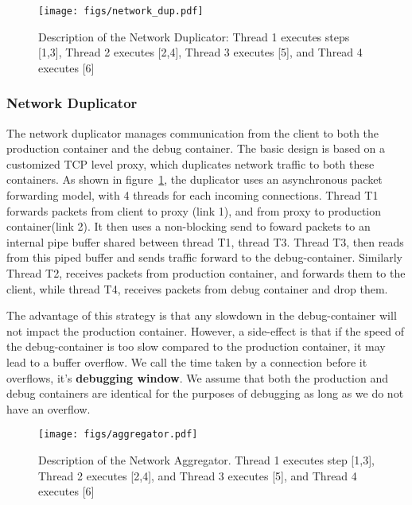 	
	\begin{figure}[ht]
		\begin{centering}
			\texttt{[image: figs/network\_dup.pdf]}
			\caption{Description of the Network Duplicator: Thread 1 executes steps [1,3], Thread 2 executes [2,4], Thread 3 executes [5], and Thread 4 executes [6]}
			\label{fig:duplicator}
		\end{centering}
	\end{figure}

\noindent \subsubsection{Network Duplicator} 
The network duplicator manages communication from the client to both the production container and the debug container.
The basic design is based on a customized TCP level proxy, which duplicates network traffic to both these containers.
As shown in figure~\ref{fig:duplicator}, the duplicator uses an asynchronous packet forwarding model, with 4 threads for each incoming connections.
Thread T1 forwards packets from client to proxy (link 1), and from proxy to production container(link 2). It then uses a non-blocking send to foward packets to an internal pipe buffer shared between thread T1, thread T3. Thread T3, then reads from this piped buffer and sends traffic forward to the debug-container. 
Similarly Thread T2, receives packets from production container, and forwards them to the client, while thread T4, receives packets from debug container and drop them. 

The advantage of this strategy is that any slowdown in the debug-container will not impact the production container.
However, a side-effect is that if the speed of the debug-container is too slow compared to the production container, it may lead to a buffer overflow. 
We call the time taken by a connection before it overflows, it's \textbf{debugging window}.
We assume that both the production and debug containers are identical for the purposes of debugging as long as we do not have an overflow. \\

\begin{figure}[ht]
	\begin{center}
		\texttt{[image: figs/aggregator.pdf]}
		\caption{Description of the Network Aggregator. Thread 1 executes step [1,3], Thread 2 executes [2,4], and Thread 3 executes [5], and Thread 4 executes [6]}
		\label{fig:aggregator}
	\end{center}
\end{figure}

